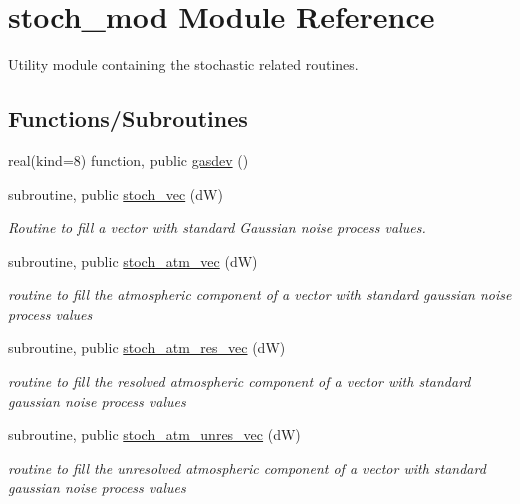 \hypertarget{namespacestoch__mod}{}\section{stoch\+\_\+mod Module Reference}
\label{namespacestoch__mod}


Utility module containing the stochastic related routines.  


\subsection*{Functions/\+Subroutines}
\begin{DoxyCompactItemize}
\item 
real(kind=8) function, public \hyperlink{namespacestoch__mod_a4ca5e456ee7b7980dcb7d2b239f0677c}{gasdev} ()
\item 
subroutine, public \hyperlink{namespacestoch__mod_ae9e26b4cf710198506d37e7d77685b47}{stoch\+\_\+vec} (dW)
\begin{DoxyCompactList}\small\item\em Routine to fill a vector with standard Gaussian noise process values. \end{DoxyCompactList}\item 
subroutine, public \hyperlink{namespacestoch__mod_aae1ccd6f37307d02916cb911fbdd605c}{stoch\+\_\+atm\+\_\+vec} (dW)
\begin{DoxyCompactList}\small\item\em routine to fill the atmospheric component of a vector with standard gaussian noise process values \end{DoxyCompactList}\item 
subroutine, public \hyperlink{namespacestoch__mod_a437bd49e6b3afcc2cddfc79badb94d09}{stoch\+\_\+atm\+\_\+res\+\_\+vec} (dW)
\begin{DoxyCompactList}\small\item\em routine to fill the resolved atmospheric component of a vector with standard gaussian noise process values \end{DoxyCompactList}\item 
subroutine, public \hyperlink{namespacestoch__mod_a03532f8f17991b20472aae0cf62e371b}{stoch\+\_\+atm\+\_\+unres\+\_\+vec} (dW)
\begin{DoxyCompactList}\small\item\em routine to fill the unresolved atmospheric component of a vector with standard gaussian noise process values \end{DoxyCompactList}\item 

\end{DoxyCompactItemize}
